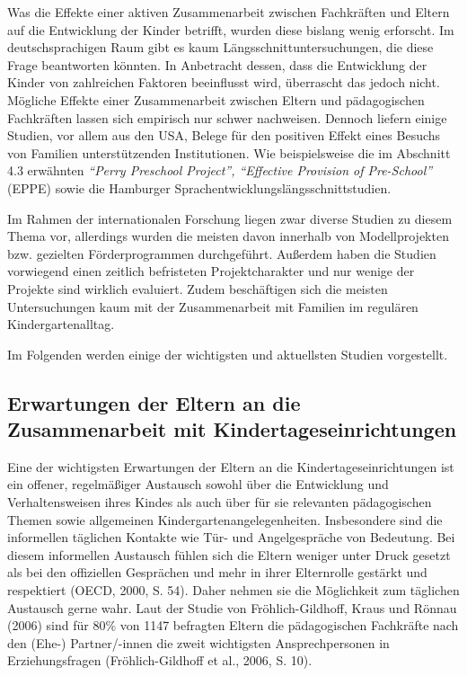 \documentclass[12pt,a4paper]{article}
\begin{document}
	Was die Effekte einer aktiven Zusammenarbeit zwischen Fachkräften und Eltern auf die Entwicklung der Kinder betrifft, wurden diese bislang wenig erforscht. Im deutschsprachigen Raum gibt es kaum Längsschnittuntersuchungen, die diese Frage beantworten könnten. In Anbetracht dessen, dass die Entwicklung der Kinder von zahlreichen Faktoren beeinflusst wird, überrascht das jedoch nicht. Mögliche Effekte einer Zusammenarbeit zwischen Eltern und pädagogischen Fachkräften lassen sich empirisch nur schwer nachweisen. Dennoch liefern einige Studien, vor allem aus den USA, Belege für den positiven Effekt eines Besuchs von Familien unterstützenden Institutionen. Wie beispielsweise die im Abschnitt 4.3 erwähnten \textit{"`Perry Preschool Project"', "`Effective Provision of Pre-School"'} (EPPE) sowie die Hamburger Sprachentwicklungslängsschnittstudien.
	
Im Rahmen der internationalen Forschung liegen zwar diverse Studien zu diesem Thema vor, allerdings wurden die meisten davon innerhalb von Modellprojekten bzw. gezielten Förderprogrammen durchgeführt. Außerdem haben die Studien vorwiegend einen zeitlich befristeten Projektcharakter und nur wenige der Projekte sind wirklich evaluiert. Zudem beschäftigen sich die meisten Untersuchungen kaum mit der Zusammenarbeit mit Familien im regulären Kindergartenalltag.

Im Folgenden werden einige der wichtigsten und aktuellsten Studien vorgestellt.

\subsection{Erwartungen der Eltern an die Zusammenarbeit mit Kindertageseinrichtungen} 
Eine der wichtigsten Erwartungen der Eltern an die Kindertageseinrichtungen ist ein offener, regelmäßiger Austausch sowohl über die Entwicklung und Verhaltensweisen ihres Kindes als auch über für sie relevanten pädagogischen Themen sowie allgemeinen Kindergartenangelegenheiten. Insbesondere sind die informellen täglichen Kontakte wie Tür- und Angelgespräche von Bedeutung. Bei diesem informellen Austausch fühlen sich die Eltern weniger unter Druck gesetzt als bei den offiziellen Gesprächen und mehr in ihrer Elternrolle gestärkt und respektiert (OECD, 2000, S. 54). Daher nehmen sie die Möglichkeit zum täglichen Austausch gerne wahr. Laut der Studie von Fröhlich-Gildhoff, Kraus und Rönnau (2006) sind für 80\% von 1147 befragten Eltern die pädagogischen Fachkräfte nach den (Ehe-) Partner/-innen die zweit wichtigsten Ansprechpersonen in Erziehungsfragen (Fröhlich-Gildhoff et al., 2006, S. 10).
	
\end{document}
